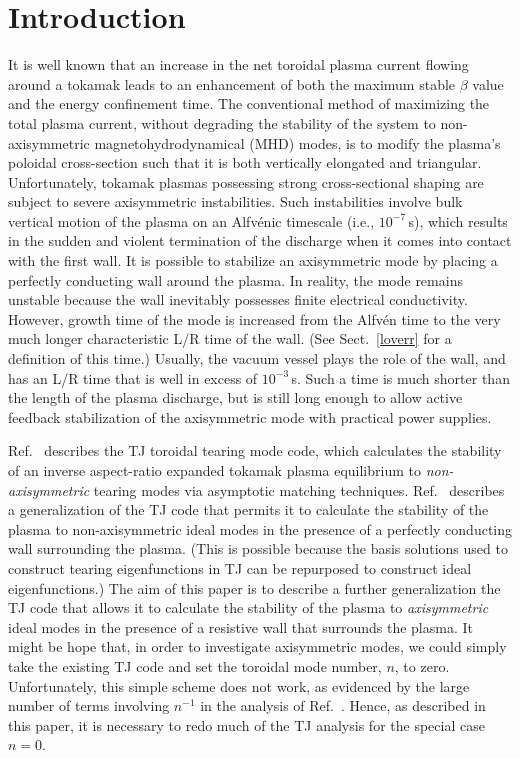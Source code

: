 \documentclass[12pt,prb,aps]{revtex4-1}
\begin{document}
\section{Introduction}
It is well known that an increase in  the net toroidal plasma current flowing around a tokamak  leads to an enhancement of both the maximum stable $\beta$ value and the energy confinement time.\cite{troyon,goldston}
The conventional method of maximizing the total plasma current, without degrading the  stability of the system to non-axisymmetric magnetohydrodynamical (MHD) modes, is
to modify the plasma's poloidal cross-section such that it is both vertically elongated and triangular.\cite{jet}  Unfortunately, tokamak plasmas possessing strong cross-sectional shaping
are subject to severe axisymmetric instabilities.\cite{v1,v2} Such instabilities involve bulk vertical motion of the plasma on an Alfv\'{e}nic timescale (i.e., $10^{-7}$\,s), which results in the
sudden and violent termination of the  discharge when it comes into contact with the first wall. It is possible to stabilize an axisymmetric mode by placing a perfectly conducting wall
around the plasma. In reality, the mode remains unstable because  the wall inevitably possesses finite electrical conductivity.\cite{rwm}  However, 
growth time of the mode is increased from the Alfv\'{e}n time to the very much longer characteristic L/R time of the wall.\cite{rwm1,rwm1a,rwm2}
(See Sect.~\ref{loverr} for a definition of this time.)
Usually, the vacuum vessel plays the role of the wall,
and has an L/R time that is  well in excess of  $10^{-3}$\,s. Such a time is much shorter than the length of the plasma 
discharge, but is still long enough to allow active feedback stabilization of the axisymmetric mode with practical power supplies.\cite{rwm3} 

Ref.~ describes the TJ toroidal tearing mode code, which calculates the stability of an inverse aspect-ratio expanded  tokamak plasma equilibrium  to {\em non-axisymmetric}\/ tearing modes via
asymptotic matching techniques. Ref.~ describes a generalization of the TJ code that permits it to calculate the stability of the plasma to non-axisymmetric
ideal modes in the presence of a perfectly conducting wall surrounding the plasma. (This is possible because the basis solutions used to construct
tearing eigenfunctions in TJ can be repurposed to construct ideal eigenfunctions.) The aim of this paper is to describe a further generalization the TJ code that  allows it to calculate
the stability of the plasma to {\em axisymmetric}\/ ideal modes in the presence of a resistive wall that surrounds the plasma. It might be hope that, in order to investigate axisymmetric
modes,  we could simply take the existing
TJ code and set the toroidal mode number, $n$, to zero. Unfortunately, this simple scheme does not work, as evidenced by the large number of terms involving
$n^{-1}$ in the analysis of Ref.~. Hence, as described in this paper, it is necessary to redo  much of the TJ analysis for the special case $n=0$. 
\end{document}
